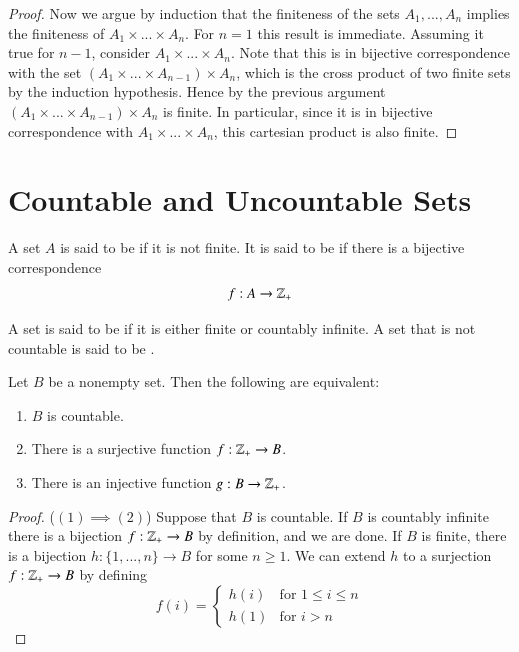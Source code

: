 \documentclass[12pt, a4paper, oneside, openright, titlepage]{book}
\begin{document}
\begin{appendices}
\begin{proof}
        Now we argue by induction that the finiteness of the sets $A_1,...,A_n$ implies the finiteness of $A_1\times ...\times A_n$. For $n = 1$ this result is immediate. Assuming it true for $n-1$, consider $A_1\times ... \times A_n$. Note that this is in bijective correspondence with the set $(A_1\times ... \times A_{n-1})\times A_n$, which is the cross product of two finite sets by the induction hypothesis. Hence by the previous argument $(A_1\times ... \times A_{n-1})\times A_n$ is finite. In particular, since it is in bijective correspondence with $A_1\times ... \times A_n$, this cartesian product is also finite.
    \end{proof}



    \section{Countable and Uncountable Sets}

    
    \begin{definition}
        A set $A$ is said to be  if it is not finite. It is said to be  if there is a bijective correspondence \begin{equation*}
            f:A\rightarrow \mathbb Z_+
        \end{equation*}
    \end{definition}


    \begin{definition}
        A set is said to be  if it is either finite or countably infinite. A set that is not countable is said to be .
    \end{definition}

    \begin{theorem}
        Let $B$ be a nonempty set. Then the following are equivalent:\begin{enumerate}
            \item $B$ is countable.
            \item There is a surjective function $f:\mathbb Z_+\rightarrow B$.
            \item There is an injective function $g:B\rightarrow \mathbb Z_+$.
        \end{enumerate}
    \end{theorem}
    \begin{proof}
        ($(1)\implies(2)$) Suppose that $B$ is countable. If $B$ is countably infinite there is a bijection $f:\mathbb Z_+\rightarrow B$ by definition, and we are done. If $B$ is finite, there is a bijection $h:\{1,...,n\}\rightarrow B$ for some $n \geq 1$. We can extend $h$ to a surjection $f:\mathbb Z_+\rightarrow B$ by defining \begin{equation*}
            f(i) = \left\{\begin{array}{ll} h(i) & \text{for } 1\leq i \leq n \\
            h(1) & \text{for } i > n \end{array}\right.
        \end{equation*}


\end{proof}
\end{appendices}
\end{document}
